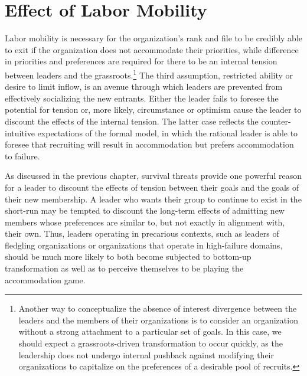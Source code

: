  
\section{Effect of Labor Mobility}

Labor mobility is necessary for the organization's rank and file to be credibly able to exit if the organization does not accommodate their priorities, while difference in priorities and preferences are required for there to be an internal tension between leaders and the
grassroots.\footnote{Another way to conceptualize the absence of interest divergence between the leaders and the members of their organizations is to consider an organization without a strong attachment to a particular set of goals. In this case, we should expect a grassroots-driven transformation to occur quickly, as the leadership does not undergo internal pushback against modifying their organizations to capitalize on the preferences of a desirable pool of recruits.} The third assumption, restricted ability or desire to limit inflow, is an avenue through which leaders are prevented from effectively socializing the new entrants. Either the leader fails to foresee the potential for tension or, more likely, circumstance or optimism cause the leader to discount the effects of the internal tension. The latter case reflects the counter-intuitive expectations of the formal model, in which the rational leader is able to foresee that recruiting will result in accommodation but prefers accommodation to failure.

As discussed in the previous chapter, survival threats provide one powerful reason for a leader to discount the effects of tension between their goals and the goals of their new membership.  A leader who wants their group to continue to exist in the short-run may be tempted to discount the long-term effects of admitting new members whose preferences are similar to, but not exactly in alignment with, their own. Thus, leaders operating in precarious contexts, such as leaders of fledgling organizations or organizations that operate in high-failure domains, should be much more likely to both become subjected to bottom-up transformation as well as to perceive themselves to be playing the accommodation game.
    
